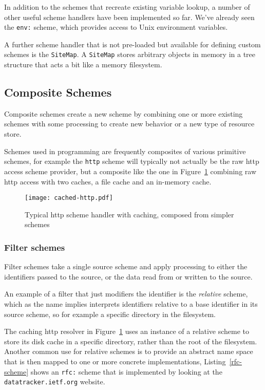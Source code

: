 \documentclass[preprint,authoryear]{llncs}
\begin{document}
In addition to the schemes that recreate existing variable lookup, a number
of other useful scheme handlers have been implemented so far.  We've
already seen the {\tt env:} scheme, which provides access to Unix
environment variables.  

A further scheme handler that is not pre-loaded but available for defining
custom schemes is the {\tt SiteMap}.  A {\tt SiteMap} stores arbitrary objects
in memory in a tree structure that acts a bit like a memory filesystem.

\subsection{Composite Schemes}
\label{compositeSchemes}
Composite schemes  create a new scheme by combining one or 
more existing schemes with some processing to create new behavior
or a new type of resource store. 

 Schemes used in programming 
are frequently composites of various primitive schemes, for example
the {\tt http} scheme will typically not actually be the raw http access
scheme provider, but a composite like the one in Figure~\ref{fig:http-cached} combining
raw http access with two caches, a file cache and an in-memory cache.


\begin{figure}[htbp]
\begin{center}
\texttt{[image: cached-http.pdf]}
\caption{Typical http scheme handler with caching, composed from simpler schemes}
\label{fig:http-cached}
\end{center}
\end{figure}


\subsubsection{Filter schemes}
\label{filterschemes}
Filter schemes take a single source scheme and apply processing to either
the identifiers passed to the source, or the data read from or written to the source.

An example of a filter that just modifiers the identifier is the \emph{relative}
scheme, which as the name implies interprets identifiers relative to a base
identifier in its source scheme, so for example a specific directory in the
filesystem.  

The caching http resolver in Figure~\ref{fig:http-cached} uses an instance
of a relative scheme to store its disk cache in a specific directory, rather
than the root of the filesystem.  Another common use for relative schemes
is to provide an abstract name space that is then mapped to one
or more  concrete implementations, Listing~\ref{rfc-scheme} shows
an {\tt rfc:} scheme that is implemented by looking at the {\tt datatracker.ietf.org}
website.
\end{document}
